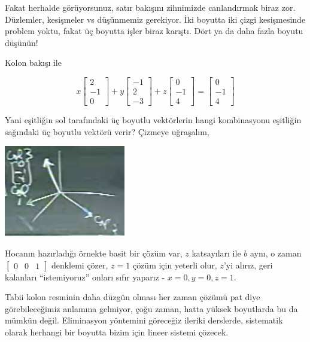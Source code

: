 \documentclass[12pt,fleqn]{article}\usepackage{../../common}
\begin{document}
Fakat herhalde görüyorsunuz, satır bakışını zihnimizde canlandırmak biraz
zor. Düzlemler, kesişmeler vs düşünmemiz gerekiyor. İki boyutta iki çizgi
kesişmesinde problem yoktu, fakat üç boyutta işler biraz karıştı. Dört ya
da daha fazla boyutu düşünün! 

Kolon bakışı ile

$$ 
x 
\left[\begin{array}{r}
2 \\
-1 \\
0
\end{array}\right]
+
y
\left[\begin{array}{r}
-1 \\
2 \\
-3
\end{array}\right]
+
z 
\left[\begin{array}{r}
0 \\
-1 \\
4
\end{array}\right]
=
\left[\begin{array}{r}
0 \\
-1 \\
4
\end{array}\right]
 $$

Yani eşitliğin sol tarafındaki üç boyutlu vektörlerin hangi kombinasyonu
eşitliğin sağındaki üç boyutlu vektörü verir? Çizmeye uğraşalım,

\includegraphics[height=4cm]{1_08.png}

Hocanın hazırladığı örnekte basit bir çözüm var, $z$ katsayıları ile $b$
aynı, o zaman $\left[\begin{array}{ccc}0&0&1\end{array}\right]$ denklemi çözer,
$z=1$ çözüm için yeterli olur, $z$'yi alırız, geri kalanları ``istemiyoruz''
onları sıfır yaparız - $x=0,y=0,z=1$.

Tabii kolon resminin daha düzgün olması her zaman çözümü pat diye
görebileceğimiz anlamına gelmiyor, çoğu zaman, hatta yüksek boyutlarda bu
da mümkün değil. Eliminasyon yöntemini göreceğiz ileriki derslerde,
sistematik olarak herhangi bir boyutta bizim için lineer sistemi çözecek. 
\end{document}
